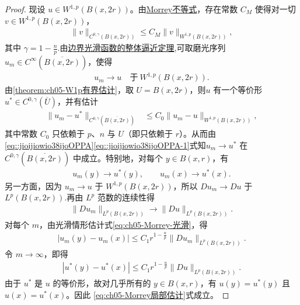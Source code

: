 \documentclass[../../main.tex]{subfiles}
\begin{document}
\begin{proof}
现设 $u\in W^{1,p}(B(x,2r))$。由\hyperref[theorem:Morrey不等式]{Morrey不等式}，存在常数 $C_M$ 使得对一切 $v\in W^{1,p}(B(x,2r))$，
\begin{align}\label{eq:ch05-Morrey-光滑}
\|v\|_{C^{0,\gamma}(B(x,2r))}\leqslant C_M\|v\|_{W^{1,p}(B(x,2r))},
\end{align}
其中 $\gamma=1-\frac{n}{p}$.由\hyperref[theorem:ch05-直到边界光滑的函数整体逼近定理]{边界光滑函数的整体逼近定理},可取磨光序列 $u_m\in C^\infty(\overline{B(x,2r)})$，使得
\begin{align}\label{eq::jioijiowio38ijoOPPA}
u_m\to u\quad\text{于}\ W^{1,p}(B(x,2r)).
\end{align}
由\cref{theorem:ch05-W1p有界估计}，取 $U=B(x,2r)$，则$u$ 有一个等价形 $u^*\in C^{0,\gamma}(\overline{U})$，并有估计
\begin{align}\label{eq::jioijiowio38ijoOPPA-1}
\|u_m-u^*\|_{C^{0,\gamma}(\overline{B(x,2r)})}
&\leqslant C_0\|u_m-u\|_{W^{1,p}(B(x,2r))},
\end{align}
其中常数 $C_0$ 只依赖于 $p$、$n$ 与 $U$（即只依赖于 $r$）。从而由\eqref{eq::jioijiowio38ijoOPPA}\eqref{eq::jioijiowio38ijoOPPA-1}式知$u_m\to u^*$ 在 $C^{0,\gamma}(\overline{B(x,2r)})$ 中成立。特别地，对每个 $y\in B(x,r)$，有
\begin{align*}
u_m(y)\to u^*(y),\qquad u_m(x)\to u^*(x).
\end{align*}
另一方面，因为 $u_m\to u$ 于 $W^{1,p}(B(x,2r))$，所以 $Du_m\to Du$ 于 $L^p(B(x,2r))$.再由 $L^p$ 范数的连续性得
\begin{align*}
\|Du_m\|_{L^p(B(x,2r))}\to \|Du\|_{L^p(B(x,2r))}.
\end{align*}
对每个 $m$，由光滑情形估计式\eqref{eq:ch05-Morrey-光滑}，得
\begin{align*}
|u_m(y)-u_m(x)|\leqslant C_1 r^{1-\frac{n}{p}}\|Du_m\|_{L^p(B(x,2r))}.
\end{align*}
令 $m\to\infty$，即得
\begin{align*}
|u^*(y)-u^*(x)|\leqslant C_1 r^{1-\frac{n}{p}}\|Du\|_{L^p(B(x,2r))}.
\end{align*}
由于 $u^*$ 是 $u$ 的等价形，故对几乎所有的 $y\in B(x,r)$，有 $u(y)=u^*(y)$ 且 $u(x)=u^*(x)$。因此 \eqref{eq:ch05-Morrey局部估计}式成立。


\end{proof}
\end{document}
